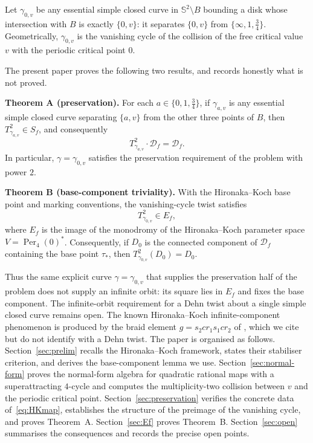 \documentclass[12pt]{article}
\theoremstyle{definition}
\theoremstyle{remark}
\numberwithin{equation}{section}
\newcommand{\Sph}{\mathbb S}
\newcommand{\Df}{\mathcal D_f}
\newcommand{\Sf}{S_f}
\newcommand{\Ef}{E_f}
\newcommand{\Per}{\operatorname{Per}}
\begin{document}
Let $\gamma_{0,v}$ be any essential simple closed curve in
$\Sph^{2}\setminus B$ bounding a disk whose intersection with $B$ is
exactly $\{0,v\}$: it separates $\{0,v\}$ from
$\{\infty,1,\tfrac34\}$.  Geometrically, $\gamma_{0,v}$ is the
vanishing cycle of the collision of the free critical value $v$ with the
periodic critical point $0$.

\medskip
The present paper proves the following two results, and records honestly
what is not proved.

\smallskip
\noindent\textbf{Theorem A (preservation).}
For each $a\in\{0,1,\tfrac34\}$, if $\gamma_{a,v}$ is any essential
simple closed curve separating $\{a,v\}$ from the other three points of
$B$, then $T_{\gamma_{a,v}}^{2}\in\Sf$, and consequently
\[
T_{\gamma_{a,v}}^{2}\cdot\Df=\Df.
\]
In particular, $\gamma=\gamma_{0,v}$ satisfies the preservation
requirement of the problem with power $2$.

\smallskip
\noindent\textbf{Theorem B (base-component triviality).}
With the Hironaka--Koch base point and marking conventions, the
vanishing-cycle twist satisfies
\[
T_{\gamma_{0,v}}^{2}\in\Ef,
\]
where $\Ef$ is the image of the monodromy of the Hironaka--Koch
parameter space $V=\Per_{4}(0)^{*}$.  Consequently, if $D_{0}$ is the
connected component of $\Df$ containing the base point $\tau_{*}$, then
$T_{\gamma_{0,v}}^{2}(D_{0})=D_{0}$.

Thus the same explicit curve $\gamma=\gamma_{0,v}$ that supplies the
preservation half of the problem does not supply an infinite orbit: its
square lies in $\Ef$ and fixes the base component.  The infinite-orbit
requirement for a Dehn twist about a single simple closed curve remains
open.  The known Hironaka--Koch infinite-component phenomenon is
produced by the braid element $g=s_{2}cr_{1}s_{1}cr_{2}$ of
\cite[Theorem~1.3 and Remark~4.7]{HK}, which we cite but do not identify
with a Dehn twist.
The paper is organised as follows.  Section~\ref{sec:prelim} recalls the
Hironaka--Koch framework, states their stabiliser criterion, and derives
the base-component lemma we use.  Section~\ref{sec:normal-form} proves
the normal-form algebra for quadratic rational maps with a
superattracting $4$-cycle and computes the multiplicity-two collision
between $v$ and the periodic critical point.
Section~\ref{sec:preservation} verifies the concrete data
of~\eqref{eq:HKmap}, establishes the structure of the preimage of the
vanishing cycle, and proves Theorem~A.  Section~\ref{sec:Ef} proves
Theorem~B.  Section~\ref{sec:open} summarises the consequences and
records the precise open points.
\end{document}
